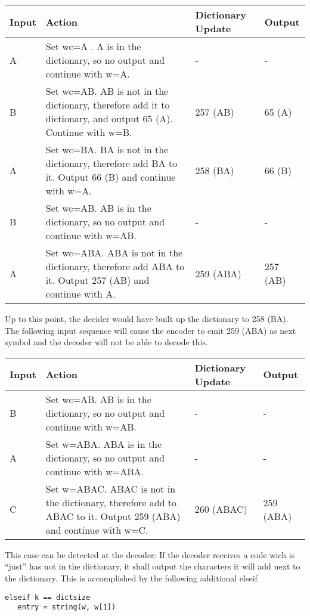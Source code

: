 \begin{longtabu} to \textwidth {
    |X[1,c]|X[5,l]|X[1,c]|X[1,c]|}
  \hline Input & Action & Dictionary Update & Output \\ \hline
  A & Set wc=A . A is in the dictionary, so no output and continue with w=A. & - & - \\ \hline
  B & Set wc=AB. AB is not in the dictionary, therefore add it to dictionary, and output 65 (A). Continue with w=B. & 257 (AB) & 65 (A) \\ \hline
  A & Set wc=BA. BA is not in the dictionary, therefore add BA to it. Output 66 (B) and continue with w=A. & 258 (BA) & 66 (B) \\ \hline
  B & Set wc=AB. AB is in the dictionary, so no output and continue with w=AB. & - & - \\ \hline
  A & Set wc=ABA. ABA is not in the dictionary, therefore add ABA to it. Output 257 (AB) and continue with A. & 259 (ABA) & 257 (AB) \\ \hline
\end{longtabu}

Up to this point, the decider would have built up the dictionary to 258 (BA). The following input sequence will cause the encoder to emit 259 (ABA) as next symbol and the decoder will not be able to decode this.

\begin{longtabu} to \textwidth {
    |X[1,c]|X[5,l]|X[1,c]|X[1,c]|}
  \hline Input & Action & Dictionary Update & Output \\ \hline
  B & Set wc=AB. AB is in the dictionary, so no output and continue with w=AB. & - & - \\ \hline
  A & Set w=ABA. ABA is in the dictionary, so no output and continue with w=ABA. & - & - \\ \hline
  C & Set w=ABAC. ABAC is not in the dictionary, therefore add to ABAC to it. Output 259 (ABA) and continue with w=C. & 260 (ABAC) & 259 (ABA) \\ \hline
\end{longtabu}

This case can be detected at the decoder: If the decoder receives a code wich is ``just'' has not in the dictionary, it shall output the characters it will add next to the dictionary. This is accomplished by the following additional elseif

\begin{verbatim}
elseif k == dictsize
   entry = string(w, w[1])
\end{verbatim}



